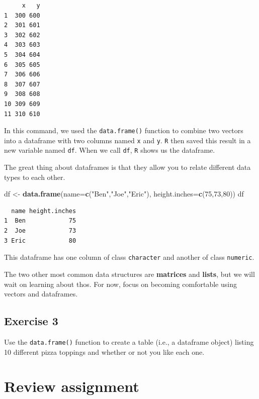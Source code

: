 \documentclass[
]{book}
\newenvironment{Shaded}{\begin{snugshade}}{\end{snugshade}}
\newcommand{\DataTypeTok}[1]{\textcolor[rgb]{0.13,0.29,0.53}{#1}}
\newcommand{\DecValTok}[1]{\textcolor[rgb]{0.00,0.00,0.81}{#1}}
\newcommand{\KeywordTok}[1]{\textcolor[rgb]{0.13,0.29,0.53}{\textbf{#1}}}
\newcommand{\NormalTok}[1]{#1}
\newcommand{\StringTok}[1]{\textcolor[rgb]{0.31,0.60,0.02}{#1}}
\begin{document}
\begin{verbatim}
     x   y
1  300 600
2  301 601
3  302 602
4  303 603
5  304 604
6  305 605
7  306 606
8  307 607
9  308 608
10 309 609
11 310 610
\end{verbatim}

In this command, we used the \texttt{data.frame()} function to combine two vectors into a dataframe with two columns named \texttt{x} and \texttt{y}. \texttt{R} then saved this result in a new variable named \texttt{df}. When we call \texttt{df}, \texttt{R} shows us the dataframe.

The great thing about dataframes is that they allow you to relate different data types to each other.

\begin{Shaded}
\begin{Highlighting}[]
\NormalTok{df <-}\StringTok{ }\KeywordTok{data.frame}\NormalTok{(}\DataTypeTok{name=}\KeywordTok{c}\NormalTok{(}\StringTok{"Ben"}\NormalTok{,}\StringTok{"Joe"}\NormalTok{,}\StringTok{"Eric"}\NormalTok{),}
                 \DataTypeTok{height.inches=}\KeywordTok{c}\NormalTok{(}\DecValTok{75}\NormalTok{,}\DecValTok{73}\NormalTok{,}\DecValTok{80}\NormalTok{))}
\NormalTok{df}
\end{Highlighting}
\end{Shaded}

\begin{verbatim}
  name height.inches
1  Ben            75
2  Joe            73
3 Eric            80
\end{verbatim}

This dataframe has one column of class \texttt{character} and another of class \texttt{numeric}.

The two other most common data structures are \textbf{matrices} and \textbf{lists}, but we will wait on learning about thos. For now, focus on becoming comfortable using vectors and dataframes.

\hypertarget{exercise-3-1}{%
\subsection*{Exercise 3}\label{exercise-3-1}}

Use the \texttt{data.frame()} function to create a table (i.e., a dataframe object) listing 10 different pizza toppings and whether or not you like each one.

\hypertarget{review-assignment-3}{%
\section*{Review assignment}\label{review-assignment-3}}
\end{document}
